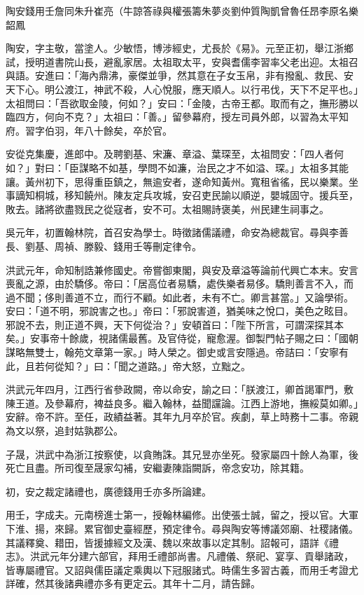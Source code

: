 
\begin{pinyinscope}
陶安錢用壬詹同朱升崔亮（牛諒答祿與權張籌朱夢炎劉仲質陶凱曾魯任昂李原名樂韶鳳

陶安，字主敬，當塗人。少敏悟，博涉經史，尤長於《易》。元至正初，舉江浙鄉試，授明道書院山長，避亂家居。太祖取太平，安與耆儒李習率父老出迎。太祖召與語。安進曰：「海內鼎沸，豪傑並爭，然其意在子女玉帛，非有撥亂、救民、安天下心。明公渡江，神武不殺，人心悅服，應天順人。以行弔伐，天下不足平也。」太祖問曰：「吾欲取金陵，何如？」安曰：「金陵，古帝王都。取而有之，撫形勝以臨四方，何向不克？」太祖曰：「善。」留參幕府，授左司員外郎，以習為太平知府。習字伯羽，年八十餘矣，卒於官。

安從克集慶，進郎中。及聘劉基、宋濂、章溢、葉琛至，太祖問安：「四人者何如？」對曰：「臣謀略不如基，學問不如濂，治民之才不如溢、琛。」太祖多其能讓。黃州初下，思得重臣鎮之，無逾安者，遂命知黃州。寬租省徭，民以樂業。坐事謫知桐城，移知饒州。陳友定兵攻城，安召吏民諭以順逆，嬰城固守。援兵至，敗去。諸將欲盡戮民之從寇者，安不可。太祖賜詩褒美，州民建生祠事之。

吳元年，初置翰林院，首召安為學士。時徵諸儒議禮，命安為總裁官。尋與李善長、劉基、周禎、滕毅、錢用壬等刪定律令。

洪武元年，命知制誥兼修國史。帝嘗御東閣，與安及章溢等論前代興亡本末。安言喪亂之源，由於驕侈。帝曰：「居高位者易驕，處佚樂者易侈。驕則善言不入，而過不聞；侈則善道不立，而行不顧。如此者，未有不亡。卿言甚當。」又論學術。安曰：「道不明，邪說害之也。」帝曰：「邪說害道，猶美味之悅口，美色之眩目。邪說不去，則正道不興，天下何從治？」安頓首曰：「陛下所言，可謂深探其本矣。」安事帝十餘歲，視諸儒最舊。及官侍從，寵愈渥。御製門帖子賜之曰：「國朝謀略無雙士，翰苑文章第一家。」時人榮之。御史或言安隱過。帝詰曰：「安寧有此，且若何從知？」曰：「聞之道路。」帝大怒，立黜之。

洪武元年四月，江西行省參政闕，帝以命安，諭之曰：「朕渡江，卿首謁軍門，敷陳王道。及參幕府，裨益良多。繼入翰林，益聞讜論。江西上游地，撫綏莫如卿。」安辭。帝不許。至任，政績益著。其年九月卒於官。疾劇，草上時務十二事。帝親為文以祭，追封姑孰郡公。

子晟，洪武中為浙江按察使，以貪賄誅。其兄昱亦坐死。發家屬四十餘人為軍，後死亡且盡。所司復至晟家勾補，安繼妻陳詣闕訴，帝念安功，除其籍。

初，安之裁定諸禮也，廣德錢用壬亦多所論建。

用壬，字成夫。元南榜進士第一，授翰林編修。出使張士誠，留之，授以官。大軍下淮、揚，來歸。累官御史臺經歷，預定律令。尋與陶安等博議郊廟、社稷諸儀。其議釋奠、耤田，皆援據經文及漢、魏以來故事以定其制。詔報可，語詳《禮志》。洪武元年分建六部官，拜用壬禮部尚書。凡禮儀、祭祀、宴享、貢舉諸政，皆專屬禮官。又詔與儒臣議定乘輿以下冠服諸式。時儒生多習古義，而用壬考證尤詳確，然其後諸典禮亦多有更定云。其年十二月，請告歸。


\end{pinyinscope}
